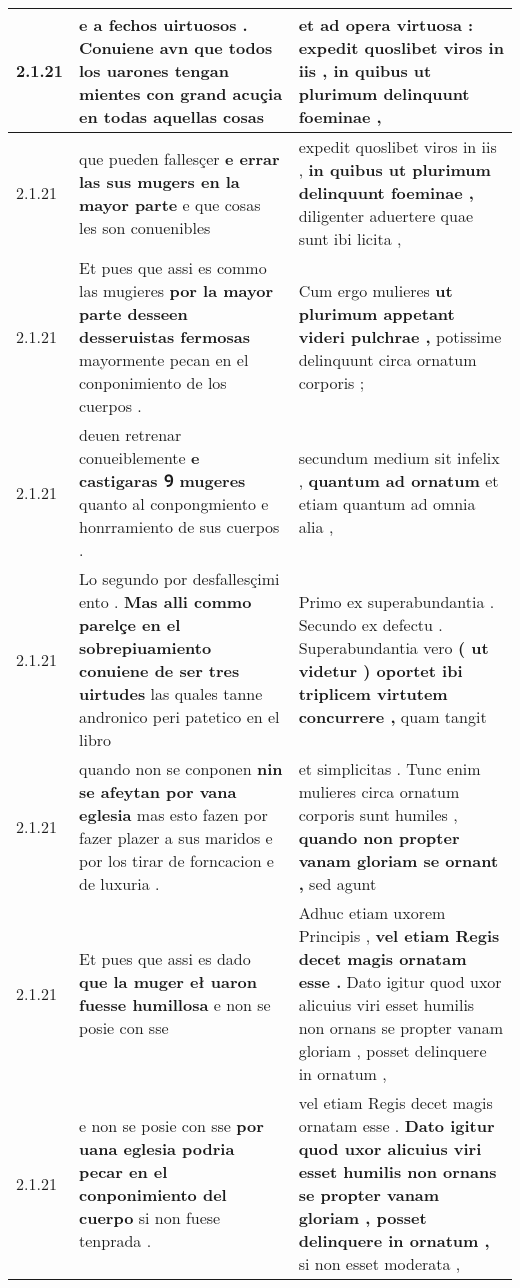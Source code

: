 \begin{tabular}{|p{1cm}|p{6.5cm}|p{6.5cm}|}
2.1.21 & e a fechos uirtuosos . \textbf{ Conuiene avn que todos los uarones tengan mientes con grand acuçia } en todas aquellas cosas & et ad opera virtuosa : \textbf{ expedit quoslibet viros in iis , } in quibus ut plurimum delinquunt foeminae , \\\hline
2.1.21 & que pueden fallesçer \textbf{ e errar las sus mugers en la mayor parte } e que cosas les son conuenibles & expedit quoslibet viros in iis , \textbf{ in quibus ut plurimum delinquunt foeminae , } diligenter aduertere quae sunt ibi licita , \\\hline
2.1.21 & Et pues que assi es commo las mugieres \textbf{ por la mayor parte desseen desseruistas fermosas } mayormente pecan en el conponimiento de los cuerpos . & Cum ergo mulieres \textbf{ ut plurimum appetant videri pulchrae , } potissime delinquunt circa ornatum corporis ; \\\hline
2.1.21 & deuen retrenar conueiblemente \textbf{ e castigaras Ꝯ mugeres } quanto al conpongmiento e honrramiento de sus cuerpos . & secundum medium sit infelix , \textbf{ quantum ad ornatum } et etiam quantum ad omnia alia , \\\hline
2.1.21 & Lo segundo por desfallesçimi ento . \textbf{ Mas alli commo parelçe en el sobrepiuamiento conuiene de ser tres uirtudes } las quales tanne andronico peri patetico en el libro & Primo ex superabundantia . Secundo ex defectu . Superabundantia vero \textbf{ ( ut videtur ) oportet ibi triplicem virtutem concurrere , } quam tangit \\\hline
2.1.21 & quando non se conponen \textbf{ nin se afeytan por vana eglesia } mas esto fazen por fazer plazer a sus maridos e por los tirar de forncacion e de luxuria . & et simplicitas . Tunc enim mulieres circa ornatum corporis sunt humiles , \textbf{ quando non propter vanam gloriam se ornant , } sed agunt \\\hline
2.1.21 & Et pues que assi es dado \textbf{ que la muger eł uaron fuesse humillosa } e non se posie con sse & Adhuc etiam uxorem Principis , \textbf{ vel etiam Regis decet magis ornatam esse . } Dato igitur quod uxor alicuius viri esset humilis non ornans se propter vanam gloriam , posset delinquere in ornatum , \\\hline
2.1.21 & e non se posie con sse \textbf{ por uana eglesia podria pecar en el conponimiento del cuerpo } si non fuese tenprada . & vel etiam Regis decet magis ornatam esse . \textbf{ Dato igitur quod uxor alicuius viri esset humilis non ornans se propter vanam gloriam , posset delinquere in ornatum , } si non esset moderata , \\\hline

\end{tabular}
